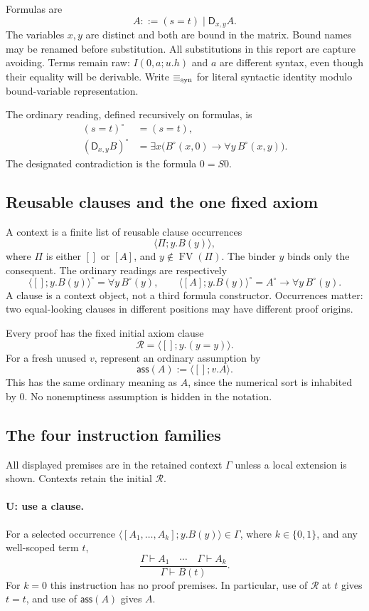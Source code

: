 \documentclass[11pt,letterpaper]{article}
\theoremstyle{definition}\newtheorem{definition}[theorem]{Definition}
\newcommand{\D}{\mathsf D}
\newcommand{\cl}[2]{\langle #1;#2\rangle}
\newcommand{\ass}[1]{\mathsf{ass}(#1)}
\newcommand{\eqsyn}{\mathrel{\equiv_{\rm syn}}}
\newcommand{\FV}{\operatorname{FV}}
\begin{document}
Formulas are
\[
 A ::= (s=t)\mid \D_{x,y}A.
\]
The variables $x,y$ are distinct and both are bound in the matrix. Bound
names may be renamed before substitution. All substitutions in this report
are capture avoiding. Terms remain raw: $I(0,a;u.h)$ and $a$ are different
syntax, even though their equality will be derivable. Write $\eqsyn$ for
literal syntactic identity modulo bound-variable representation.

The ordinary reading, defined recursively on formulas, is
\begin{align*}
 (s=t)^\circ&=(s=t),\\
 (\D_{x,y}B)^\circ
   &=\exists x\bigl(B^\circ(x,0)\to\forall y\,B^\circ(x,y)\bigr).
\end{align*}
The designated contradiction is the formula $0=S0$.

\subsection{Reusable clauses and the one fixed axiom}

A context is a finite list of reusable clause occurrences
\[
                  \cl{\Pi}{y.B(y)},
\]
where $\Pi$ is either $[]$ or $[A]$, and $y\notin\FV(\Pi)$. The binder
$y$ binds only the consequent. The ordinary readings are respectively
\[
 \cl{[]}{y.B(y)}^\circ=\forall y\,B^\circ(y),\qquad
 \cl{[A]}{y.B(y)}^\circ=A^\circ\to\forall y\,B^\circ(y).
\]
A clause is a context object, not a third formula constructor. Occurrences
matter: two equal-looking clauses in different positions may have different
proof origins.

Every proof has the fixed initial axiom clause
\[
                    \boxed{\mathcal R=\cl{[]}{y.(y=y)}.}       \tag{R}
\]
For a fresh unused $v$, represent an ordinary assumption by
\[
                    \ass A:=\cl{[]}{v.A}.
\]
This has the same ordinary meaning as $A$, since the numerical sort is
inhabited by $0$. No nonemptiness assumption is hidden in the notation.

\subsection{The four instruction families}

All displayed premises are in the retained context $\Gamma$ unless a
local extension is shown. Contexts retain the initial $\mathcal R$.

\paragraph{U: use a clause.}
For a selected occurrence $\cl{[A_1,\ldots,A_k]}{y.B(y)}\in\Gamma$, where
$k\in\{0,1\}$, and any well-scoped term $t$,
\[
 \frac{\Gamma\vdash A_1\quad\cdots\quad\Gamma\vdash A_k}
      {\Gamma\vdash B(t)}.                              \tag{U}
\]
For $k=0$ this instruction has no proof premises. In particular, use of
$\mathcal R$ at $t$ gives $t=t$, and use of $\ass A$ gives $A$.
\end{document}
